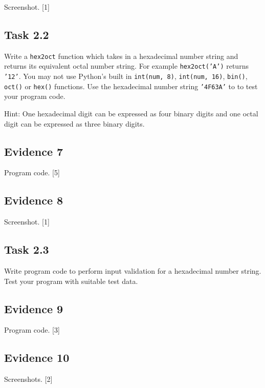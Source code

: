 Screenshot. \hfill{} {[}1{]}

\subsection*{Task 2.2 }

Write a \texttt{hex2oct} function which takes in a hexadecimal number
string and returns its equivalent octal number string. For example
\texttt{hex2oct('A')} returns \texttt{'12'}. You may not use Python's
built in \texttt{int(num, 8)}, \texttt{int(num, 16)}, \texttt{bin()},
\texttt{oct()} or \texttt{hex()} functions. Use the hexadecimal number
string \texttt{'4F63A'} to to test your program code. 

Hint: One hexadecimal digit can be expressed as four binary digits
and one octal digit can be expressed as three binary digits. 

\subsection*{Evidence 7 }

Program code. \hfill{}{[}5{]}

\subsection*{Evidence 8 }

Screenshot. \hfill{}{[}1{]}

\subsection*{Task 2.3 }

Write program code to perform input validation for a hexadecimal number
string. Test your program with suitable test data. 

\subsection*{Evidence 9 }

Program code. \hfill{}{[}3{]}

\subsection*{Evidence 10 }

Screenshots. \hfill{}{[}2{]}